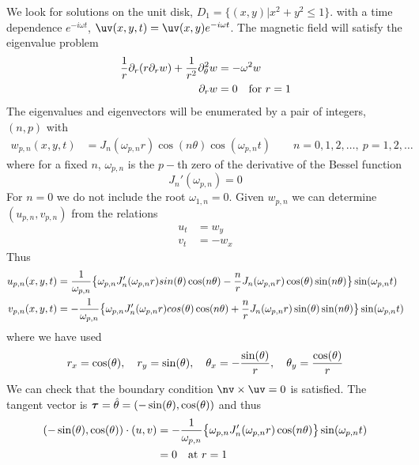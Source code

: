 \documentclass[10pt]{article}
\begin{document}
We look for solutions on the unit disk, $D_1 = \{ (x,y) | x^2+y^2 \le 1 \}$.
with a time dependence $e^{-i\omega t}$, $\uv(x,y,t)=\uv(x,y)e^{-i\omega t}$.
The magnetic field will satisfy the eigenvalue problem
\begin{align*}
  {1\over r}\partial_r( r \partial_r w ) + {1\over r^2} \partial_\theta^2 w &= -\omega^2 w \\
\partial_r w &=0 \quad\mbox{for $r=1$}
\end{align*}
The eigenvalues and eigenvectors will be enumerated by a pair of integers, $(n,p)$ with 
\begin{align*}
   w_{p,n}(x,y,t) & = J_n( \omega_{p,n} r ) \cos(n \theta) \cos(\omega_{p,n} t)
                  \qquad n=0,1,2,\ldots,~p=1,2,\ldots
\end{align*}
where for a fixed $n$, $\omega_{p,n}$ is the $p-$th zero of the derivative of the Bessel function
\[
     J_n'(\omega_{p,n})=0
\]
For $n=0$ we do not include the root $\omega_{1,n}=0$.
Given $w_{p,n}$ we can determine $(u_{p,n},v_{p,n})$ from the relations
\begin{align*}
    u_t & = w_y \\
    v_t & = -w_x
\end{align*}
Thus
\begin{align*}
   u_{p,n}(x,y,t) &=  {1\over \omega_{p,n}}\big\{ 
              \omega_{p,n}J_n'(\omega_{p,n} r ) sin(\theta)\cos(n \theta)
                 - {n\over r} J_n(\omega_{p,n} r ) \cos(\theta) \sin(n \theta)  \big\}   \sin(\omega_{p,n} t) \\
   v_{p,n}(x,y,t) &= -{1\over \omega_{p,n}}\big\{ 
              \omega_{p,n}J_n'(\omega_{p,n} r ) cos(\theta)\cos(n \theta) 
                 + {n\over r} J_n(\omega_{p,n} r ) \sin(\theta) \sin(n \theta)  \big\}   \sin(\omega_{p,n} t) 
\end{align*}
where we have used
\[
  r_x = \cos(\theta), \quad  r_y = \sin(\theta) 
          ,\quad \theta_x =  -{\sin(\theta)\over r}
          ,\quad \theta_y =  {\cos(\theta)\over r} 
\]
We can check that the boundary condition $\nv\times\uv=0$ is satisfied.
The tangent vector is $\boldsymbol{\tau}=\hat{\theta}=(-\sin(\theta),\cos(\theta))$ and thus
\begin{align*}
 (-\sin(\theta),\cos(\theta))\cdot(u,v) &= 
    - {1\over \omega_{p,n}}\big\{ \omega_{p,n}J_n'(\omega_{p,n} r )\cos(n \theta)
                         \big\}   \sin(\omega_{p,n} t) \\
             & = 0 \quad\mbox{at $r=1$}
\end{align*}
\end{document}
